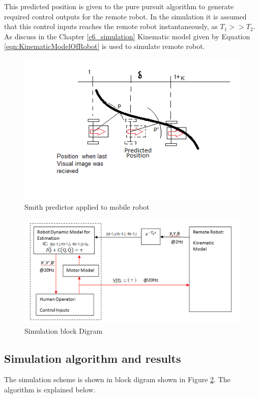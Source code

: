 This predicted position is given to the pure pursuit algorithm to generate required control outputs for the remote robot. In the simulation it is assumed that this control inputs reaches the remote robot instantaneously, as $T_1>> T_2$. As discuss in the Chapter \ref{c6_simulation}   Kinematic model given by Equation \ref{eqn:KinematicModelOfRobot} is used to simulate remote robot.
 \begin{figure}
	\includegraphics[width=1.2\linewidth]{Chapter7/fig/robotPredictPos}
	\caption{Smith predictor applied to mobile robot}
	\label{fig:SmithRobot}
\end{figure}
 \begin{figure}
	\includegraphics[width=\linewidth]{Chapter7/fig/Sumilation_BlkDgm}
	\caption{Simulation block Digram}
	\label{fig:SimBlock}
\end{figure}
\subsection{Simulation algorithm and  results} 
The simulation scheme is  shown in block digram shown in Figure \ref{fig:SimBlock}. The algorithm  is explained  below.

